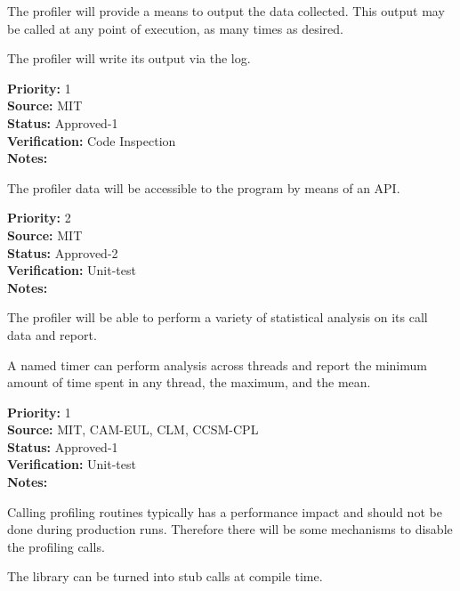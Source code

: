 The profiler will provide a means to output the data collected.  This output may
be called at any point of execution, as many times as desired.


The profiler will write its output via the log.  

\begin{reqlist}
{\bf Priority:} 1 \\
{\bf Source:}  MIT \\
{\bf Status:} Approved-1 \\
{\bf Verification:} Code Inspection \\
{\bf Notes:} 
\end{reqlist}


The profiler data will be accessible to the program by means of an API.
\begin{reqlist}
{\bf Priority:} 2 \\
{\bf Source:} MIT  \\
{\bf Status:} Approved-2 \\
{\bf Verification:} Unit-test \\
{\bf Notes:} 
\end{reqlist}


The profiler will be able to perform a variety of statistical analysis on its call
data and report.


A named timer can perform analysis across threads and report the 
minimum amount of time spent in any thread, the maximum, and the mean.

\begin{reqlist}
{\bf Priority:} 1 \\
{\bf Source:}  MIT, CAM-EUL, CLM, CCSM-CPL \\
{\bf Status:} Approved-1 \\
{\bf Verification:} Unit-test \\
{\bf Notes:} 
\end{reqlist}


Calling profiling routines typically has a performance impact and should not
be done during production runs.  Therefore there will be some mechanisms to 
disable the profiling calls.


The library can be turned into stub calls at compile time.

